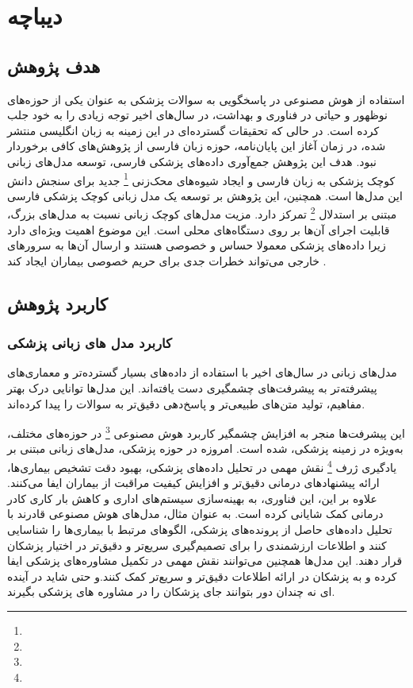 
\chapter{دیباچه}
\section{هدف پژوهش}

استفاده از هوش مصنوعی در پاسخگویی به سوالات پزشکی به عنوان یکی از حوزه‌های نوظهور و حیاتی در فناوری و بهداشت، در سال‌های اخیر توجه زیادی را به خود جلب کرده است. در حالی که تحقیقات گسترده‌ای در این زمینه به زبان انگلیسی منتشر شده، در زمان آغاز این پایان‌نامه، حوزه زبان فارسی از پژوهش‌های کافی برخوردار نبود. هدف این پژوهش جمع‌آوری داده‌های پزشکی فارسی، توسعه مدل‌های زبانی کوچک پزشکی به زبان فارسی و ایجاد شیوه‌های محک‌زنی
\footnote{}
جدید برای سنجش دانش این مدل‌ها است. همچنین، این پژوهش بر توسعه یک مدل زبانی کوچک پزشکی فارسی مبتنی بر استدلال
\footnote{}
تمرکز دارد. مزیت مدل‌های کوچک زبانی نسبت به مدل‌های بزرگ، قابلیت اجرای آن‌ها بر روی دستگاه‌های محلی است. این موضوع اهمیت ویژه‌ای دارد زیرا داده‌های پزشکی معمولا حساس و خصوصی هستند و ارسال آن‌ها به سرورهای خارجی می‌تواند خطرات جدی برای حریم خصوصی بیماران ایجاد کند
\cite{b1}.
\section{کاربرد پژوهش}
\subsection{کاربرد مدل های زبانی پزشکی}
مدل‌های زبانی در سال‌های اخیر با استفاده از داده‌های بسیار گسترده‌تر و معماری‌های پیشرفته‌تر به پیشرفت‌های چشمگیری دست یافته‌اند. این مدل‌ها توانایی درک بهتر مفاهیم، تولید متن‌های طبیعی‌تر و پاسخ‌دهی دقیق‌تر به سوالات را پیدا کرده‌اند. 

 این پیشرفت‌ها منجر به افزایش چشمگیر کاربرد هوش مصنوعی
\footnote{}
در حوزه‌های مختلف، به‌ویژه در زمینه پزشکی، شده است.
\cite{b2}
امروزه در حوزه پزشکی، مدل‌های زبانی مبتنی بر یادگیری ژرف
\footnote{}
نقش مهمی در تحلیل داده‌های پزشکی، بهبود دقت تشخیص بیماری‌ها، ارائه پیشنهادهای درمانی دقیق‌تر و افزایش کیفیت مراقبت از بیماران ایفا می‌کنند. علاوه بر این، این فناوری، به بهینه‌سازی سیستم‌های اداری و کاهش بار کاری کادر درمانی کمک شایانی کرده است. به عنوان مثال، مدل‌های هوش مصنوعی قادرند با تحلیل داده‌های حاصل از پرونده‌های پزشکی، الگوهای مرتبط با بیماری‌ها را شناسایی کنند و اطلاعات ارزشمندی را برای تصمیم‌گیری سریع‌تر و دقیق‌تر در اختیار پزشکان قرار دهند. 
این مدل‌ها همچنین می‌توانند نقش مهمی در تکمیل مشاوره‌های پزشکی ایفا کرده و به پزشکان در ارائه اطلاعات دقیق‌تر و سریع‌تر کمک کنند.و حتی شاید در آینده ای نه چندان دور بتوانند جای پزشکان را در مشاوره های پزشکی بگیرند.
\cite{b3}

